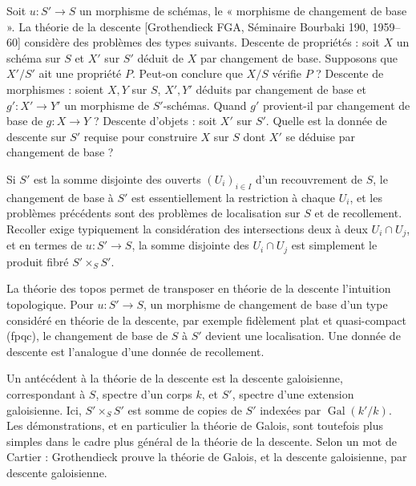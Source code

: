 \documentclass[11pt]{article}
\begin{document}
Soit \(u:S'\to S\) un morphisme de schémas, le « morphisme de changement de base ». La théorie de la descente [Grothendieck FGA, Séminaire Bourbaki 190, 1959--60] considère des problèmes des types suivants. Descente de propriétés : soit \(X\) un schéma sur \(S\) et \(X'\) sur \(S'\) déduit de \(X\) par changement de base. Supposons que \(X'/S'\) ait une propriété \(P\). Peut-on conclure que \(X/S\) vérifie \(P\) ? Descente de morphismes : soient \(X,Y\) sur \(S\), \(X',Y'\) déduits par changement de base et \(g':X'\to Y'\) un morphisme de \(S'\)-schémas. Quand \(g'\) provient-il par changement de base de \(g:X\to Y\) ? Descente d'objets : soit \(X'\) sur \(S'\). Quelle est la donnée de descente sur \(S'\) requise pour construire \(X\) sur \(S\) dont \(X'\) se déduise par changement de base ?

Si \(S'\) est la somme disjointe des ouverts \((U_i)_{i\in I}\) d'un recouvrement de \(S\), le changement de base à \(S'\) est essentiellement la restriction à chaque \(U_i\), et les problèmes précédents sont des problèmes de localisation sur \(S\) et de recollement. Recoller exige typiquement la considération des intersections deux à deux \(U_i\cap U_j\), et en termes de \(u:S'\to S\), la somme disjointe des \(U_i\cap U_j\) est simplement le produit fibré \(S'\times_S S'\).

La théorie des topos permet de transposer en théorie de la descente l'intuition topologique. Pour \(u:S'\to S\), un morphisme de changement de base d'un type considéré en théorie de la descente, par exemple fidèlement plat et quasi-compact (fpqc), le changement de base de \(S\) à \(S'\) devient une localisation. Une donnée de descente est l'analogue d'une donnée de recollement.

Un antécédent à la théorie de la descente est la descente galoisienne, correspondant à \(S\), spectre d'un corps \(k\), et \(S'\), spectre d'une extension galoisienne. Ici, \(S'\times_S S'\) est somme de copies de \(S'\) indexées par \(\operatorname{Gal}(k'/k)\). Les démonstrations, et en particulier la théorie de Galois, sont toutefois plus simples dans le cadre plus général de la théorie de la descente. Selon un mot de Cartier : Grothendieck prouve la théorie de Galois, et la descente galoisienne, par descente galoisienne.
\end{document}
